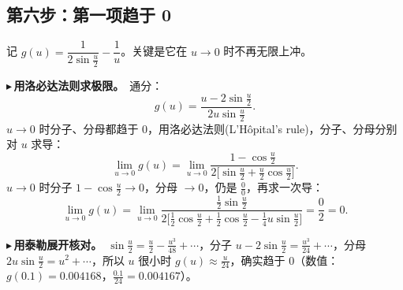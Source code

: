 \documentclass[UTF8,a4paper,11pt]{ctexart}
\newcounter{ex}[section]
\newcommand{\point}[1]{\par\addvspace{1ex}\noindent\textcolor{ptteal}{$\blacktriangleright$\,\textbf{#1}}\ }
\begin{document}
\subsection{第六步：第一项趋于 0}
记 $g(u)=\dfrac{1}{2\sin\frac u2}-\dfrac1u$。关键是它在 $u\to0$ 时不再无限上冲。

\point{用洛必达法则求极限。}通分：
\[
g(u)=\frac{u-2\sin\frac u2}{2u\sin\frac u2}.
\]
$u\to0$ 时分子、分母都趋于 $0$，用洛必达法则(L'H\^opital's rule)，分子、分母分别对 $u$ 求导：
\[
\lim_{u\to0}g(u)=\lim_{u\to0}\frac{1-\cos\frac u2}{2\big[\sin\frac u2+\frac u2\cos\frac u2\big]}.
\]
$u\to0$ 时分子 $1-\cos\frac u2\to0$，分母 $\to0$，仍是 $\frac00$，再求一次导：
\[
\lim_{u\to0}g(u)=\lim_{u\to0}\frac{\frac12\sin\frac u2}{2\big[\frac12\cos\frac u2+\frac12\cos\frac u2-\frac14u\sin\frac u2\big]}=\frac{0}{2}=0 .
\]

\point{用泰勒展开核对。}$\sin\frac u2=\frac u2-\frac{u^3}{48}+\cdots$，分子 $u-2\sin\frac u2=\frac{u^3}{24}+\cdots$，分母 $2u\sin\frac u2=u^2+\cdots$，所以 $u$ 很小时 $g(u)\approx\frac{u}{24}$，确实趋于 $0$（数值：$g(0.1)=0.004168$，$\frac{0.1}{24}=0.004167$）。
\end{document}
